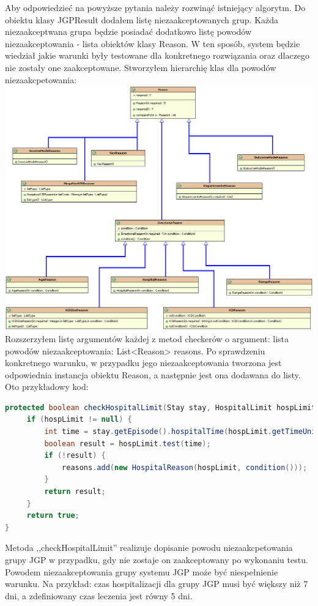 Aby odpowiedzieć na powyższe pytania należy rozwinąć istniejący algorytm. Do obiektu klasy JGPResult dodałem listę niezaakceptowanych grup. Każda niezaakceptwana grupa będzie posiadać dodatkowo listę powodów niezaakceptowania - lista obiektów klasy Reason. W ten sposób, system będzie wiedział jakie warunki były testowane dla konkretnego rozwiązania oraz dlaczego nie zostały one zaakceptowane. 
Stworzyłem hierarchię klas dla powodów niezaakcpetowania:
\vspace*{0.2cm}
\includegraphics[scale=0.4]{images/reason-classes2}
\vspace*{0.2cm}
Rozszerzyłem listę argumentów każdej z metod checkerów o argument: lista powodów niezaakceptowania: List<Reason> reasons. 
Po sprawdzeniu konkretnego warunku, w przypadku jego niezaakceptowania tworzona jest odpowiednia instancja obiektu Reason, a następnie jest ona  dodawana do listy. Oto przykładowy kod:
\newpage
\begin{lstlisting}[language=Java]
protected boolean checkHospitalLimit(Stay stay, HospitalLimit hospLimit, List<Reason> reasons) {
     if (hospLimit != null) {
         int time = stay.getEpisode().hospitalTime(hospLimit.getTimeUnit());
         boolean result = hospLimit.test(time);
         if (!result) {
             reasons.add(new HospitalReason(hospLimit, condition()));
         }
         return result;
     }
     return true;
}
\end{lstlisting}

Metoda ,,checkHospitalLimit'' realizuje dopisanie powodu niezaakcpetowania grupy JGP w przypadku, gdy nie zostaje on zaakceptowany po wykonaniu testu. Powodem niezaakceptowania grupy systemu JGP może być niespełnienie warunku. Na przykład: czas hospitalizacji dla grupy JGP musi być większy niż 7 dni, a zdefiniowany czas leczenia jest równy 5 dni.

